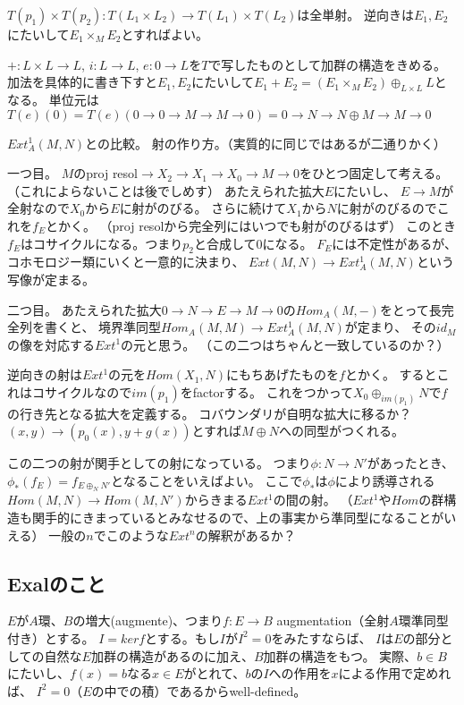 \documentclass{jsarticle}
\begin{document}
$T(p_1) \times T(p_2):T(L_1 \times L_2) \to T(L_1) \times T(L_2)$は全単射。
逆向きは$E_1 , E_2$にたいして$E_1 \times_M E_2$とすればよい。

$+:L\times L \to L$, $i: L \to L$, $e:0 \to L$を$T$で写したものとして加群の構造をきめる。
加法を具体的に書き下すと$E_1, E_2$にたいして$E_1 + E_2 = (E_1 \times_M E_2) \oplus _{L\times L} L$となる。
単位元は$T(e)(0) = T(e)(0 \to 0\to M \to M\to 0) = 0\to N \to N\oplus M \to M \to 0$

$Ext^1_A(M, N)$との比較。
射の作り方。（実質的に同じではあるが二通りかく）

一つ目。
$M$のproj resol$ \to X_2 \to X_1 \to X_0 \to M \to 0$をひとつ固定して考える。（これによらないことは後でしめす）
あたえられた拡大$E$にたいし、
$E\to M$が全射なので$X_0$から$E$に射がのびる。
さらに続けて$X_1$から$N$に射がのびるのでこれを$f_E$とかく。
（proj resolから完全列にはいつでも射がのびるはず）
このとき$f_E$はコサイクルになる。つまり$p_2$と合成して$0$になる。
$F_E$には不定性があるが、コホモロジー類にいくと一意的に決まり、
$Ext(M, N) \to Ext^1_A(M, N)$という写像が定まる。

二つ目。
あたえられた拡大$0\to N\to E\to M\to 0$の$Hom_A(M, -)$をとって長完全列を書くと、
境界準同型$Hom_A(M, M)\to Ext_A^1(M, N)$が定まり、
その$id_M$の像を対応する$Ext^1$の元と思う。
（この二つはちゃんと一致しているのか？）


逆向きの射は$Ext^1$の元を$Hom(X_1, N)$にもちあげたものを$f$とかく。
するとこれはコサイクルなので$im(p_1)$をfactorする。
これをつかって$X_0 \oplus_{im(p_1)} N$で$f$の行き先となる拡大を定義する。
コバウンダリが自明な拡大に移るか？$(x,y) \to (p_0(x), y+g(x))$とすれば$M\oplus N$への同型がつくれる。

この二つの射が関手としての射になっている。
つまり$\phi:N \to N'$があったとき、$\phi_*(f_E)=f_{E\oplus_N N'}$となることをいえばよい。
ここで$\phi_*$は$\phi$により誘導される$Hom(M, N) \to Hom(M, N')$からきまる$Ext^1$の間の射。
（$Ext^1$や$Hom$の群構造も関手的にきまっているとみなせるので、上の事実から準同型になることがいえる）
一般の$n$でこのような$Ext^n$の解釈があるか？

\subsection{Exalのこと}

$E$が$A$環、$B$の増大(augmente)、つまり$f: E \to B$ augmentation（全射$A$環準同型付き）とする。
$I = ker f$とする。もし$I$が$I^2=0$をみたすならば、
$I$は$E$の部分としての自然な$E$加群の構造があるのに加え、$B$加群の構造をもつ。
実際、$b\in B$にたいし、$f(x)=b$なる$x\in E$がとれて、$b$の$I$への作用を$x$による作用で定めれば、
$I^2=0$（$E$の中での積）であるからwell-defined。
\end{document}

